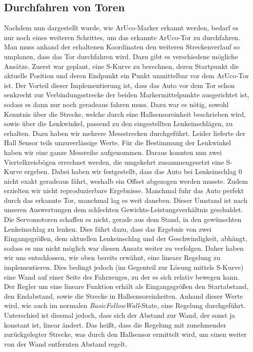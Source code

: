 \subsection{Durchfahren von Toren}
Nachdem nun dargestellt wurde, wie ArUco-Marker erkannt werden, bedarf es nur noch eines weiteren Schrittes, um das erkannte ArUco-Tor zu durchfahren. Man muss anhand der erhaltenen Koordinaten den weiteren Streckenverlauf so umplanen, dass das Tor durchfahren wird. 
\newline
Dazu gibt es verschiedene mögliche Ansätze. Zuerst war geplant, eine S-Kurve zu berechnen, deren Startpunkt die aktuelle Position und deren Endpunkt ein Punkt unmittelbar vor dem ArUco-Tor ist. Der Vorteil dieser Implementierung ist, dass das Auto vor dem Tor schon senkrecht zur Verbindungsstrecke der beiden Markermittelpunkte ausgerichtet ist, sodass es dann nur noch geradeaus fahren muss. Dazu war es nötig, sowohl Kenntnis über die Strecke, welche durch eine Hallsensoreinheit beschrieben wird, sowie über die Lenkwinkel, passend zu den eingestellten Lenkeinschlägen, zu erhalten. Dazu haben wir mehrere Messstrecken durchgeführt. Leider lieferte der Hall Sensor teils unzuverlässige Werte. Für die Bestimmung der Lenkwinkel haben wir eine ganze Messreihe aufgenommen. Daraus konnten nun zwei Viertelkreisbögen errechnet werden, die umgekehrt zusammengesetzt eine S-Kurve ergeben. Dabei haben wir festgestellt, dass das Auto bei Lenkeinschlag 0 nicht exakt geradeaus fährt, weshalb ein Offset abgezogen werden musste. Zudem erzielten wir nicht reproduzierbare Ergebnisse. Manchmal fuhr das Auto perfekt durch das erkannte Tor, manchmal lag es weit daneben. Dieser Umstand ist nach unseren Auswertungen dem schlechten Gewichts-Leistungsverhältnis geschuldet. Die Servomotoren schaffen es nicht, gerade aus dem Stand, in den gewünschten Lenkeinschlag zu lenken. Dies führt dazu, dass das Ergebnis von zwei Eingangsgrößen, dem aktuellen Lenkeinschlag und der Geschwindigkeit, abhängt, sodass es uns nicht möglich war diesen Ansatz weiter zu verfolgen. 
\newline
\newline
Daher haben wir uns entschlossen, wie oben bereits erwähnt, eine lineare Regelung zu implementieren. Dies bedingt jedoch (im Gegenteil zur Lösung mittels S-Kurve) eine Wand auf einer Seite des Fahrzeuges, zu der es sich relativ bewegen kann. 
\newline
\newline
Der Regler um eine lineare Funktion erhält als Eingangsgrößen den Startabstand, den Endabstand, sowie die Strecke in Hallsensoreinheiten. Anhand dieser Werte wird, wie auch im normalen \textit{BasicFollowWall}-State, eine Regelung durchgeführt. Unterschied ist diesmal jedoch, dass sich der Abstand zur Wand, der sonst ja konstant ist, linear ändert. Das heißt, dass die Regelung mit zunehmender zurückgelegter Strecke, was durch den Hallsensor ermittelt wird, um einen weiter von der Wand entfernten Abstand regelt. 
